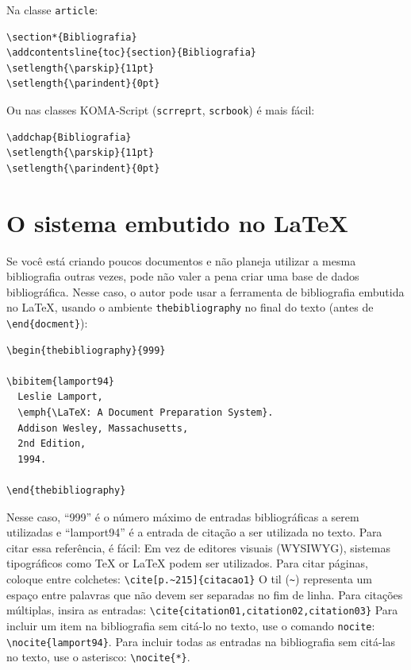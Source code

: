 Na classe \texttt{article}:

\begin{verbatim}
\section*{Bibliografia}
\addcontentsline{toc}{section}{Bibliografia}
\setlength{\parskip}{11pt}
\setlength{\parindent}{0pt}
\end{verbatim}

Ou nas classes KOMA-Script (\texttt{scrreprt}, \texttt{scrbook}) é mais fácil:

\begin{verbatim}
\addchap{Bibliografia}
\setlength{\parskip}{11pt}
\setlength{\parindent}{0pt}
\end{verbatim}

\section{O sistema embutido no LaTeX}
\label{bibliografia-latex-embutido}
Se você está criando poucos documentos e não planeja utilizar a mesma bibliografia outras vezes, pode não valer a pena criar uma base de dados bibliográfica. Nesse caso, o autor pode usar a ferramenta de bibliografia embutida no LaTeX, usando o ambiente \texttt{thebibliography} no final do texto (antes de \verb+\end{docment}+):

\begin{verbatim}
\begin{thebibliography}{999}

\bibitem{lamport94}
  Leslie Lamport,
  \emph{\LaTeX: A Document Preparation System}.
  Addison Wesley, Massachusetts,
  2nd Edition,
  1994.

\end{thebibliography}
\end{verbatim}

Nesse caso, “999” é o número máximo de entradas bibliográficas a serem utilizadas e “lamport94” é a entrada de citação a ser utilizada no texto. Para citar essa referência, é fácil: 
Em vez de editores visuais (WYSIWYG), sistemas tipográficos como \TeX{} or \LaTeX{} \cite{lamport94} podem ser utilizados.
Para citar páginas, coloque entre colchetes:
\verb+\cite[p.~215]{citacao1}+
O til (\verb+~+) representa um espaço entre palavras que não devem ser separadas no fim de linha. 
Para citações múltiplas, insira as entradas:\newline
\verb+\cite{citation01,citation02,citation03}+
Para incluir um item na bibliografia sem citá-lo no texto, use o comando \texttt{nocite}: \verb+\nocite{lamport94}+. Para incluir todas as entradas na bibliografia sem citá-las no texto, use o asterisco: \verb+\nocite{*}+. 

